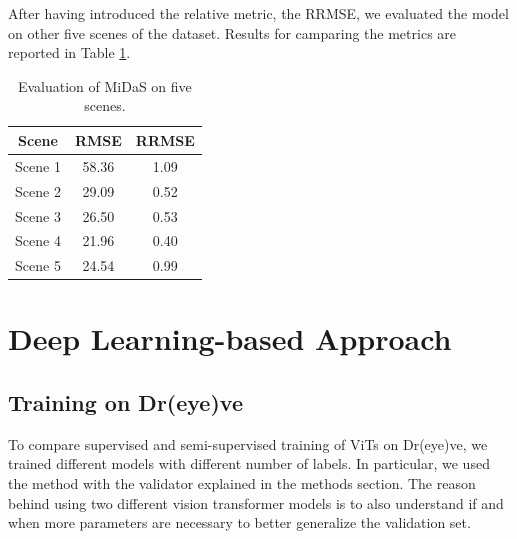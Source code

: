 After having introduced the relative metric, the RRMSE, we evaluated the model 
on other five scenes of the dataset. Results for camparing the metrics are reported in 
Table \ref{tab:mde_metrics}.
\begin{table}[h]
    \vspace{0.3cm}
    \centering
    \begin{tabular}{ccc}
    \hline
    \textbf{Scene} & \textbf{RMSE} & \textbf{RRMSE} \\ \hline\hline
    Scene 1 & 58.36 & 1.09 \\ \hline
    Scene 2 & 29.09 & 0.52 \\ \hline
    Scene 3 & 26.50 & 0.53 \\ \hline
    Scene 4 & 21.96 & 0.40 \\ \hline
    Scene 5 & 24.54 & 0.99 \\ \hline
    \end{tabular}
    \caption{Evaluation of MiDaS on five scenes.}
    \label{tab:mde_metrics}
\end{table}



\section {Deep Learning-based Approach}
\subsection{Training on Dr(eye)ve}
To compare supervised and semi-supervised training of ViTs on Dr(eye)ve, we 
trained different models with different number of labels. In particular, we 
used the method with the validator explained in the methods section.
The reason behind using two different vision transformer models is to also 
understand if and when more parameters are necessary to better generalize the 
validation set.

